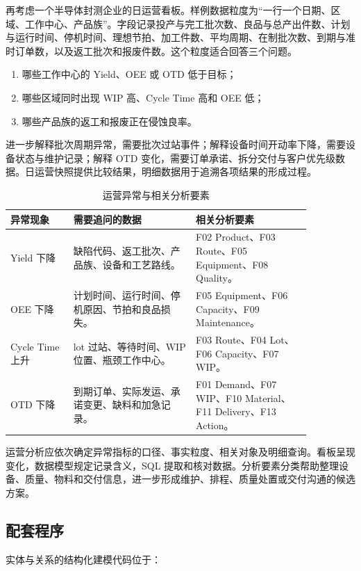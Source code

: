 再考虑一个半导体封测企业的日运营看板。样例数据粒度为“一行一个日期、区域、工作中心、产品族”。字段记录投产与完工批次数、良品与总产出件数、计划与运行时间、停机时间、理想节拍、加工件数、平均周期、在制批次数、到期与准时订单数，以及返工批次和报废件数。这个粒度适合回答三个问题。

\begin{enumerate}
  \item 哪些工作中心的 Yield、OEE 或 OTD 低于目标；
  \item 哪些区域同时出现 WIP 高、Cycle Time 高和 OEE 低；
  \item 哪些产品族的返工和报废正在侵蚀良率。
\end{enumerate}

进一步解释批次周期异常，需要批次过站事件；解释设备时间开动率下降，需要设备状态与维护记录；解释 OTD 变化，需要订单承诺、拆分交付与客户优先级数据。日运营快照提供比较结果，明细数据用于追溯各项结果的形成过程。

\begin{table}[htbp]
\centering
\caption{运营异常与相关分析要素}
\begin{tabular}{P{0.18\linewidth}P{0.35\linewidth}P{0.33\linewidth}}
\toprule
{}
异常现象 & 需要追问的数据 & 相关分析要素\\
\midrule
Yield 下降 & 缺陷代码、返工批次、产品族、设备和工艺路线。 & F02 Product、F03 Route、F05 Equipment、F08 Quality。\\
OEE 下降 & 计划时间、运行时间、停机原因、节拍和良品损失。 & F05 Equipment、F06 Capacity、F09 Maintenance。\\
Cycle Time 上升 & lot 过站、等待时间、WIP 位置、瓶颈工作中心。 & F03 Route、F04 Lot、F06 Capacity、F07 WIP。\\
OTD 下降 & 到期订单、实际发运、承诺变更、缺料和加急记录。 & F01 Demand、F07 WIP、F10 Material、F11 Delivery、F13 Action。\\
\bottomrule
\end{tabular}
\end{table}

运营分析应依次确定异常指标的口径、事实粒度、相关对象及明细查询。看板呈现变化，数据模型规定记录含义，SQL 提取和核对数据。分析要素分类帮助整理设备、质量、物料和交付信息，进一步形成维护、排程、质量处置或交付沟通的候选方案。

\subsection{配套程序}

实体与关系的结构化建模代码位于：
\begin{center}
\end{center}


